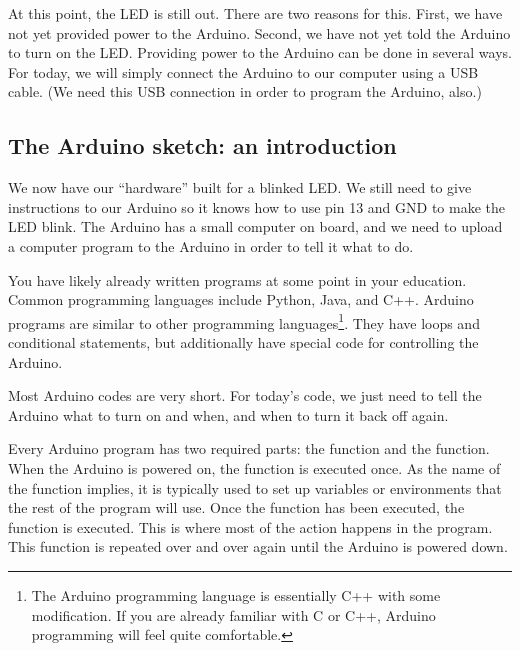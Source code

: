 At this point, the LED is still out. There are two reasons for this. First, we
have not yet provided power to the Arduino. Second, we have not yet told the 
Arduino to turn on the LED. Providing power to the Arduino can be done in
several ways. For today, we will simply connect the Arduino to our computer
using a USB cable. (We need this USB connection in order to program the
Arduino, also.)

\subsection{The Arduino sketch: an introduction}

We now have our ``hardware'' built for a blinked LED. We still need to 
give instructions to our Arduino so it knows how to use pin 13 and GND to
make the LED blink. The Arduino has a small computer on board, and we need
to upload a computer program to the Arduino in order to tell it what to do.

You have likely already written programs at some point in your education. 
Common programming languages include Python, Java, and C++. Arduino programs
are similar to other programming languages\footnote{The Arduino programming
language is essentially C++ with some modification. If you are already familiar
with C or C++, Arduino programming will feel quite comfortable.}. 
They have loops and conditional statements, but additionally have special code
for controlling the Arduino.

Most Arduino codes are very short. For today's code, we just need to tell the
Arduino what to turn on and when, and when to turn it back off again.

Every Arduino program has two required parts: the  function and
the  function. When the Arduino is powered on, the 
function is executed once. As the name of the function implies, it is typically
used to set up variables or environments that the rest of the program will use.
Once the  function has been executed, the  function
is executed. This is where most of the action happens in the program. This 
function is repeated over and over again until the Arduino is powered down.

